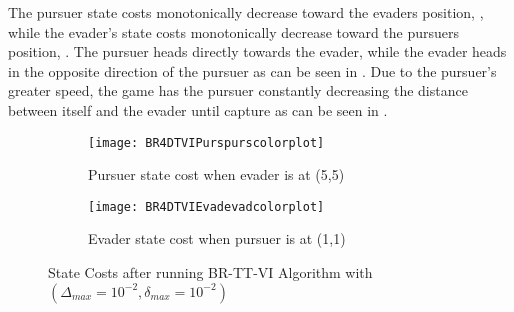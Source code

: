 The pursuer state costs monotonically decrease toward the evaders position, , while the evader's state costs monotonically decrease toward the pursuers position, . The pursuer heads directly towards the evader, while the evader heads in the opposite direction of the pursuer as can be seen in . Due to the pursuer's greater speed, the game has the pursuer constantly decreasing the distance between itself and the evader until capture as can be seen in .
\begin{figure}[h!]
\centering
\begin{subfigure}[t]{0.475\textwidth}
	\centering
	\texttt{[image: BR4DTVIPurspurscolorplot]}
	\caption{Pursuer state cost when evader is at (5,5)}
	\label{BR4DTVIPcp}
\end{subfigure}
\hfill
\begin{subfigure}[t]{0.475\textwidth}
	\centering
	\texttt{[image: BR4DTVIEvadevadcolorplot]}
	\caption{Evader state cost when pursuer is at (1,1)}
	\label{BR4DTVIEcp}
\end{subfigure}
\caption{State Costs after running BR-TT-VI Algorithm with $(\Delta_{max} = 10^{-2},\delta_{max} = 10^{-2})$}
\label{BR4DTVIcp}
\end{figure}
